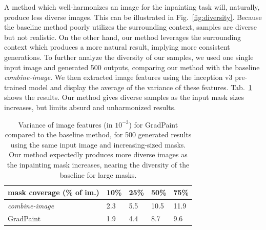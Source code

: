 A method which well-harmonizes an image for the inpainting task will, naturally, produce less diverse images. This can be illustrated in Fig.~\ref{fig:diversity}. Because the baseline method poorly utilizes the surrounding context, samples are diverse but not realistic. On the other hand, our method leverages the surrounding context which produces a more natural result, implying more consistent generations. 
To further analyze the diversity of our samples, we used one single input image and generated 500 outputs, comparing our method with the baseline \emph{combine-image}. We then extracted image features using the inception v3 pre-trained model\citep{inceptionv3} and display the average of the variance of these features. Tab.~\ref{tab:diversitytab} shows the results. Our method gives diverse samples as the input mask sizes increases, but limits absurd and unharmonized results.



\begin{table}[]
\centering
\begin{tabular}{|l|l|l|l|l|}
\hline
\multicolumn{1}{|c|}{ mask coverage (\% of im.)} & \multicolumn{1}{c|}{10\%} & \multicolumn{1}{c|}{25\%} & \multicolumn{1}{c|}{50\%} & \multicolumn{1}{c|}{75\%} \\ \hline
\textit{combine-image}                            & 2.3                       & 5.5                       & 10.5                      & 11.9                      \\ \hline
GradPaint                                         & 1.9                       & 4.4                       & 8.7                       & 9.6                       \\ \hline
\end{tabular}
\caption{Variance of image features (in $10^{-3}$) for GradPaint compared to the baseline method, for 500 generated results using the same input image and increasing-sized masks.  Our method expectedly produces more diverse images as the inpainting mask increases, nearing the diversity of the baseline for large masks.}
\label{tab:diversitytab}
\vspace{-.45cm}
\end{table}





